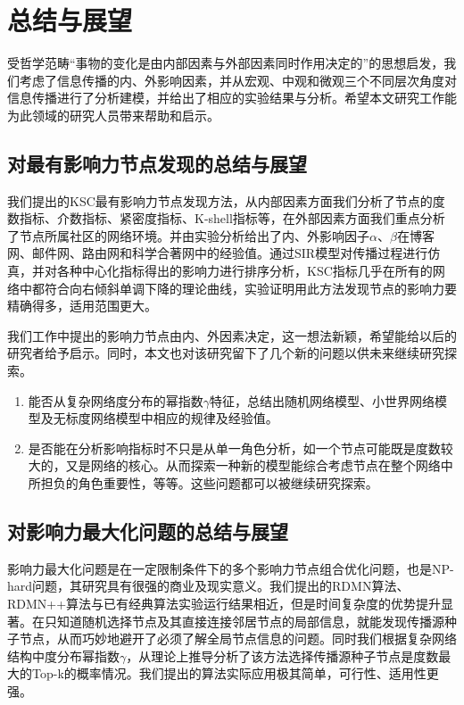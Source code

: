 

\chapter{总结与展望}
\label{cha:5thChap06}
受哲学范畴“事物的变化是由内部因素与外部因素同时作用决定的”的思想启发，我们考虑了信息传播的内、外影响因素，并从宏观、中观和微观三个不同层次角度对信息传播进行了分析建模，并给出了相应的实验结果与分析。希望本文研究工作能为此领域的研究人员带来帮助和启示。
\section{对最有影响力节点发现的总结与展望}
我们提出的KSC最有影响力节点发现方法，从内部因素方面我们分析了节点的度数指标、介数指标、紧密度指标、K-shell指标等，在外部因素方面我们重点分析了节点所属社区的网络环境。并由实验分析给出了内、外影响因子$\alpha$、$\beta$在博客网、邮件网、路由网和科学合著网中的经验值。通过SIR模型对传播过程进行仿真，并对各种中心化指标得出的影响力进行排序分析，KSC指标几乎在所有的网络中都符合向右倾斜单调下降的理论曲线，实验证明用此方法发现节点的影响力要精确得多，适用范围更大。

我们工作中提出的影响力节点由内、外因素决定，这一想法新颖，希望能给以后的研究者给予启示。同时，本文也对该研究留下了几个新的问题以供未来继续研究探索。
\begin{enumerate}[(1)]
	\item 能否从复杂网络度分布的幂指数$\gamma$特征，总结出随机网络模型、小世界网络模型及无标度网络模型中相应的规律及经验值。
	\item 是否能在分析影响指标时不只是从单一角色分析，如一个节点可能既是度数较大的，又是网络的核心。从而探索一种新的模型能综合考虑节点在整个网络中所担负的角色重要性，等等。这些问题都可以被继续研究探索。
\end{enumerate}

\section{对影响力最大化问题的总结与展望}
影响力最大化问题是在一定限制条件下的多个影响力节点组合优化问题，也是NP-hard问题，其研究具有很强的商业及现实意义。我们提出的RDMN算法、RDMN++算法与已有经典算法实验运行结果相近，但是时间复杂度的优势提升显著。在只知道随机选择节点及其直接连接邻居节点的局部信息，就能发现传播源种子节点，从而巧妙地避开了必须了解全局节点信息的问题。同时我们根据复杂网络结构中度分布幂指数$\gamma$，从理论上推导分析了该方法选择传播源种子节点是度数最大的Top-k的概率情况。我们提出的算法实际应用极其简单，可行性、适用性更强。

